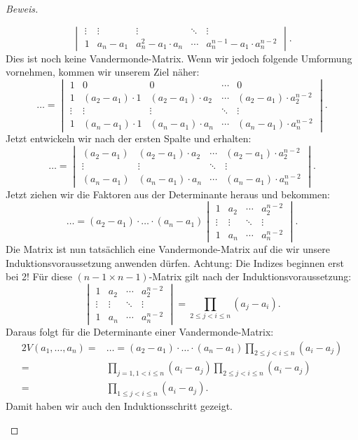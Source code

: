 \documentclass[12pt, a4paper, oneside, titlepage]{report}
\newenvironment{bew}{\begin{proof}[Beweis]}{\end{proof}}
\theoremstyle{definition}
\begin{document}
\begin{bew}
\begin{itemize}
{$$\begin{vmatrix}
				\vdots & \vdots & \vdots & \ddots & \vdots \\     
				1 & a_n - a_1 & a_n^2 - a_1 \cdot a_n & \cdots & a_n^{n-1} - a_1 \cdot a_n^{n-2}
				\end{vmatrix}.$$
				Dies ist noch keine Vandermonde-Matrix. Wenn wir jedoch folgende Umformung vornehmen, kommen wir unserem Ziel näher:
				$$ \ldots = 
				\begin{vmatrix}
				1 & 0 & 0 & \cdots & 0 \\
				1 & (a_2 - a_1) \cdot 1 & (a_2 - a_1) \cdot a_2 & \cdots & (a_2 - a_1) \cdot a_2^{n-2} \\
				\vdots & \vdots & \vdots & \ddots & \vdots \\     
				1 & (a_n - a_1) \cdot 1 & (a_n - a_1) \cdot a_n & \cdots & (a_n - a_1) \cdot a_n^{n-2}
				\end{vmatrix}.$$
				Jetzt entwickeln wir nach der ersten Spalte und erhalten:
				$$ \ldots = \begin{vmatrix}
				(a_2 - a_1) & (a_2 - a_1) \cdot a_2 & \cdots & (a_2 - a_1) \cdot a_2^{n-2} \\
				\vdots & \vdots & \ddots & \vdots \\     
				(a_n - a_1) & (a_n - a_1) \cdot a_n & \cdots & (a_n - a_1) \cdot a_n^{n-2}
				\end{vmatrix}.$$
				Jetzt ziehen wir die Faktoren aus der Determinante heraus und bekommen:
				$$ \ldots = (a_2 - a_1) \cdot \ldots \cdot (a_n - a_1)
				\begin{vmatrix}
				1 & a_2 & \cdots & a_2^{n-2} \\
				\vdots & \vdots & \ddots & \vdots \\     
				1 & a_n & \cdots & a_n^{n-2}
				\end{vmatrix}.$$
				Die Matrix ist nun tatsächlich eine Vandermonde-Matrix auf die wir unsere Induktionsvoraussetzung anwenden dürfen. Achtung: Die Indizes beginnen erst bei 2! Für diese $ (n-1 \times n-1) $-Matrix gilt nach der Induktionsvoraussetzung:
				$$\begin{vmatrix}
				1 & a_2 & \cdots & a_2^{n-2} \\
				\vdots & \vdots & \ddots & \vdots \\     
				1 & a_n & \cdots & a_n^{n-2}
				\end{vmatrix}
				= \prod_{2 \leq j < i \leq n} (a_j-a_i).$$
				Daraus folgt für die Determinante einer Vandermonde-Matrix:
				\begin{alignat*}{2}
				V(a_1, \dots, a_n) = & \ldots = (a_2 - a_1) \cdot \ldots \cdot (a_n - a_1) \prod_{2 \leq j < i \leq n} (a_i - a_j)\\
				 = & \prod_{j=1, 1 < i \leq n} (a_i - a_j) \prod_{2 \leq j < i \leq n} (a_i - a_j)\\
				 = & \prod_{1 \leq j < i \leq n} (a_i - a_j).
				\end{alignat*}
			Damit haben wir auch den Induktionsschritt gezeigt.
			}
		\end{itemize}
	\end{bew}
	
\end{document}
